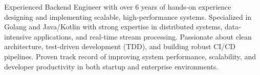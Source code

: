 

\begin{cvparagraph}

Experienced Backend Engineer with over 6 years of hands-on experience designing and implementing scalable, high-performance systems. Specialized in Golang and Java/Kotlin with strong expertise in distributed systems, data-intensive applications, and real-time stream processing. Passionate about clean architecture, test-driven development (TDD), and building robust CI/CD pipelines. Proven track record of improving system performance, scalability, and developer productivity in both startup and enterprise environments.
\end{cvparagraph}
